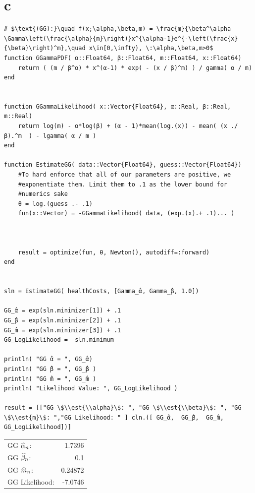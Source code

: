 \documentclass[12pt, letterpaper]{paper}
\begin{document}
\section{c}
\label{sec:org7fb1ca9}
\begin{verbatim}
# $\text{(GG):}\quad f(x;\alpha,\beta,m) = \frac{m}{\beta^\alpha \Gamma\left(\frac{\alpha}{m}\right)}x^{\alpha-1}e^{-\left(\frac{x}{\beta}\right)^m},\quad x\in[0,\infty), \:\alpha,\beta,m>0$
function GGammaPDF( α::Float64, β::Float64, m::Float64, x::Float64)
    return ( (m / β^α) * x^(α-1) * exp( - (x / β)^m) ) / gamma( α / m)
end


function GGammaLikelihood( x::Vector{Float64}, α::Real, β::Real, m::Real)
    return log(m) - α*log(β) + (α - 1)*mean(log.(x)) - mean( (x ./ β).^m  ) - lgamma( α / m )    
end

function EstimateGG( data::Vector{Float64}, guess::Vector{Float64})
    #To hard enforce that all of our parameters are positive, we
    #exponentiate them. Limit them to .1 as the lower bound for
    #numerics sake
    θ = log.(guess .- .1)
    fun(x::Vector) = -GGammaLikelihood( data, (exp.(x).+ .1)... )



    result = optimize(fun, θ, Newton(), autodiff=:forward)
end


sln = EstimateGG( healthCosts, [Gamma_̂α, Gamma_̂β, 1.0])

GG_̂α = exp(sln.minimizer[1]) + .1
GG_̂β = exp(sln.minimizer[2]) + .1
GG_̂m = exp(sln.minimizer[3]) + .1
GG_LogLikelihood = -sln.minimum

println( "GG ̂α = ", GG_̂α)
println( "GG ̂β = ", GG_̂β )
println( "GG ̂m = ", GG_̂m )
println( "Likelihood Value: ", GG_LogLikelihood )

result = [["GG \$\\est{\\alpha}\$: ", "GG \$\\est{\\beta}\$: ", "GG \$\\est{m}\$: ","GG Likelihood: " ] cln.([ GG_̂α,  GG_̂β,  GG_̂m, GG_LogLikelihood])]

\end{verbatim}

\begin{center}
\begin{tabular}{lr}
GG \(\widehat{ \alpha }_{n}\): & 1.7396\\
GG \(\widehat{ \beta }_{n}\): & 0.1\\
GG \(\widehat{ m }_{n}\): & 0.24872\\
GG Likelihood: & -7.0746\\
\end{tabular}
\end{center}
\end{document}

